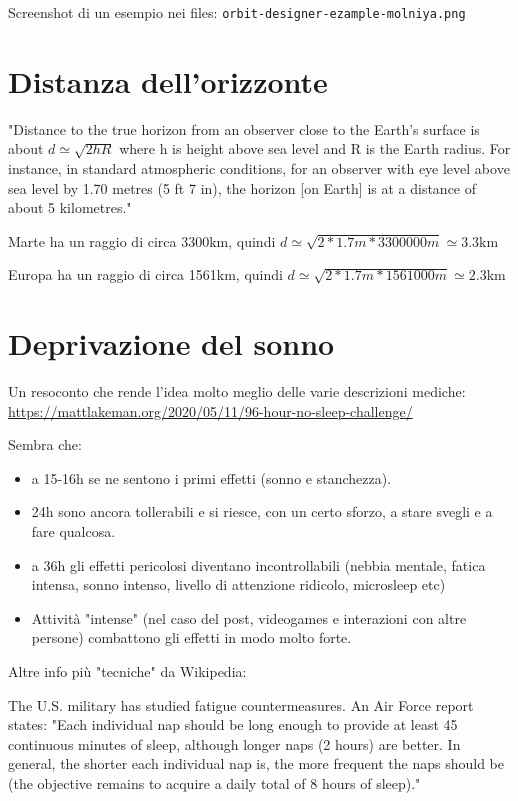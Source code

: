 \documentclass[a4paper,10pt,openany,oneside]{memoir}
\begin{document}
Screenshot di un esempio nei files: \texttt{orbit-designer-ezample-molniya.png}

\section{Distanza dell'orizzonte}

"Distance to the true horizon from an observer close to the Earth's surface is about $d \simeq \sqrt{2 h R}$  where h is height above sea level and R is the Earth radius. For instance, in standard atmospheric conditions, for an observer with eye level above sea level by 1.70 metres (5 ft 7 in), the horizon [on Earth] is at a distance of about 5 kilometres."

Marte ha un raggio di circa 3300km, quindi $d \simeq \sqrt{2*1.7m*3300000m} \simeq 3.3$km

Europa ha un raggio di circa 1561km, quindi $d \simeq \sqrt{2*1.7m*1561000m} \simeq 2.3$km

\section{Deprivazione del sonno}

Un resoconto che rende l'idea molto meglio delle varie descrizioni mediche: \url{https://mattlakeman.org/2020/05/11/96-hour-no-sleep-challenge/}

Sembra che:
\begin{itemize}
\item a 15-16h se ne sentono i primi effetti (sonno e stanchezza).
\item 24h sono ancora tollerabili e si riesce, con un certo sforzo, a stare svegli e a fare qualcosa.
\item a 36h gli effetti pericolosi diventano incontrollabili (nebbia mentale, fatica intensa, sonno intenso, livello di attenzione ridicolo, microsleep etc)
\item Attività "intense" (nel caso del post, videogames e interazioni con altre persone) combattono gli effetti in modo molto forte.
\end{itemize}

Altre info più "tecniche" da Wikipedia:

The U.S. military has studied fatigue countermeasures. An Air Force report states: "Each individual nap should be long enough to provide at least 45 continuous minutes of sleep, although longer naps (2 hours) are better. In general, the shorter each individual nap is, the more frequent the naps should be (the objective remains to acquire a daily total of 8 hours of sleep)."
\end{document}
